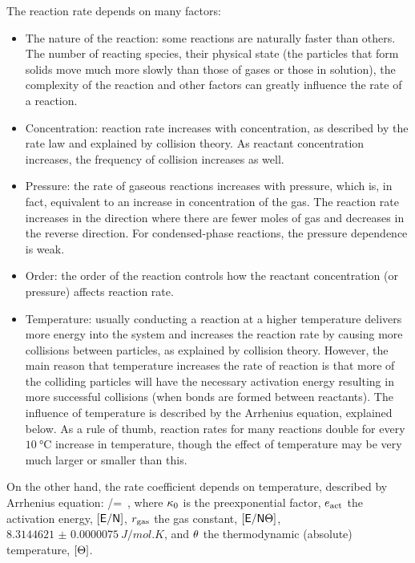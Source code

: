 The reaction rate depends on many factors:
\begin{itemize}
\item The nature of the reaction: some reactions are naturally faster than others. The number of reacting species, their physical state (the particles that form solids move much more slowly than those of gases or those in solution), the complexity of the reaction and other factors can greatly influence the rate of a reaction.
%
\item Concentration: reaction rate increases with concentration, as described by the rate law and explained by collision theory. As reactant concentration increases, the frequency of collision increases as well.
%
\item Pressure: the rate of gaseous reactions increases with pressure, which is, in fact, equivalent to an increase in concentration of the gas. The reaction rate increases in the direction where there are fewer moles of gas and decreases in the reverse direction. For condensed-phase reactions, the pressure dependence is weak.
%
\item Order: the order of the reaction controls how the reactant concentration (or pressure) affects reaction rate.
%
\item Temperature: usually conducting a reaction at a higher temperature delivers more energy into the system and increases the reaction rate by causing more collisions between particles, as explained by collision theory. However, the main reason that temperature increases the rate of reaction is that more of the colliding particles will have the necessary activation energy resulting in more successful collisions (when bonds are formed between reactants). The influence of temperature is described by the Arrhenius equation, explained below. As a rule of thumb, reaction rates for many reactions double for every $\SI{10}{\celsius}$ increase in temperature, though the effect of temperature may be very much larger or smaller than this.
\end{itemize}

On the other hand, the rate coefficient depends on temperature, described by Arrhenius equation:
\beq
\krcoeff\vat\temp/\freqfact = \exp{}\,,
\eeq
where $\kappa_0$ is the preexponential factor, $e_\text{act}$ the activation energy, $[\mathsf{E}/\mathsf{N}]$, $r_\text{gas}$ the gas constant, $[\mathsf{E}/\mathsf{N}\Theta]$, $\SI{8.3144621(75)}{J/mol.K}$, and $\theta$ the thermodynamic (absolute) temperature, $[\Theta]$.

